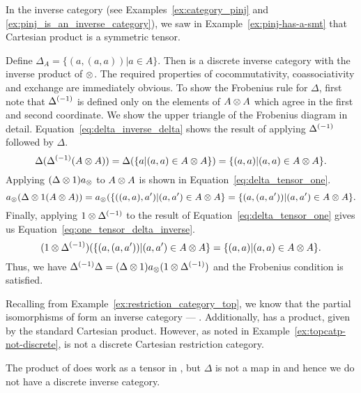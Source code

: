\begin{example}\label{ex:pinj_is_a_discrete_inverse_category}
  In the inverse category \pinj (see Examples~\ref{ex:category_pinj} and
  \ref{ex:pinj_is_an_inverse_category}), we saw in Example~\ref{ex:pinj-has-a-smt} that Cartesian
  product is a symmetric tensor.

  Define $\Delta_A = \{(a,(a,a)) | a\in A\}$. Then \pinj is a discrete inverse category with the
  inverse product of $\otimes$. The required properties of cocommutativity, coassociativity and
  exchange are immediately obvious. To show the Frobenius rule for $\Delta$, first note that
  ${\Delta}^{(-1)}$ is defined only on the elements of $A\otimes A$ which agree in the first and second
  coordinate. We show the upper triangle of the Frobenius diagram in
  detail. Equation~\ref{eq:delta_inverse_delta} shows the result of applying ${\Delta}^{(-1)}$ followed by
  $\Delta$.
  \begin{equation}
    \Delta({\Delta}^{(-1)}(A\otimes A)) = \Delta(\{a | (a,a) \in A\otimes A\})
    = \{(a,a) | (a,a) \in A\otimes A\}.\label{eq:delta_inverse_delta}
  \end{equation}
  Applying $(\Delta \otimes 1)a_{\otimes}$ to $A\otimes A$ is shown in Equation~\ref{eq:delta_tensor_one}.
  \begin{equation}
    a_{\otimes}(\Delta\otimes1(A\otimes A)) = a_{\otimes}(\{((a,a),a') | (a,a') \in A\otimes A\} = \{(a,(a,a')) | (a,a') \in
    A\otimes A\}.\label{eq:delta_tensor_one}
  \end{equation}
  Finally, applying $1 \otimes {\Delta}^{(-1)}$ to the result of Equation~\ref{eq:delta_tensor_one} gives us
  Equation~\ref{eq:one_tensor_delta_inverse}.
  \begin{equation}
    (1\otimes{\Delta}^{(-1)})(\{(a,(a,a')) | (a,a') \in  A\otimes A\} = \{(a,a) | (a,a) \in A\otimes A\} \label{eq:one_tensor_delta_inverse}.
  \end{equation}
  Thus, we have ${\Delta}^{(-1)}\Delta = (\Delta \otimes 1) a_{\otimes} (1\otimes{\Delta}^{(-1)})$ and the Frobenius
  condition is satisfied.
\end{example}

\begin{example}\label{ex:topcat_does_not_give_a_discrete_inverse_category}
  Recalling \topcatp from Example~\ref{ex:restriction_category_top}, we know that the partial
  isomorphisms of \topcatp form an inverse category --- \Inv{\topcatp}. Additionally, \topcatp has a
  product, given by the standard Cartesian product. However, as noted in
  Example~\ref{ex:topcatp-not-discrete}, \topcatp is not a discrete Cartesian restriction category.

  The product of \topcatp does work as a tensor in \Inv{\topcatp}, but $\Delta$  is not a map in
  \Inv{\topcat} and hence we do not have a discrete inverse  category.
\end{example}

